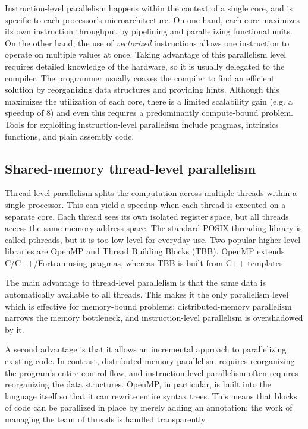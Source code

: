 \documentclass[conference, a4paper]{IEEEtran-modified}
\begin{document}
    Instruction-level parallelism happens within the context of a single core, and is specific to each processor's microarchitecture. On one hand, each core maximizes its own instruction throughput by pipelining and parallelizing functional units. On the other hand, the use of \emph{vectorized} instructions allows one instruction to operate on multiple values at once. Taking advantage of this parallelism level requires detailed knowledge of the hardware, so it is usually delegated to the compiler. The programmer usually coaxes the compiler to find an efficient solution by reorganizing data structures and providing hints. Although this maximizes the utilization of each core, there is a limited scalability gain (e.g. a speedup of 8) and even this requires a predominantly compute-bound problem. Tools for exploiting instruction-level parallelism include  pragmas, intrinsics functions, and plain assembly code.


\subsection{Shared-memory thread-level parallelism}

    Thread-level parallelism splits the computation across multiple threads within a single processor. This can yield a speedup when each thread is executed on a separate core. Each thread sees its own isolated register space, but all threads access the same memory address space. The standard POSIX threading library is called pthreads, but it is too low-level for everyday use. Two popular higher-level libraries are OpenMP and Thread Building Blocks (TBB). OpenMP extends C/C++/Fortran using pragmas, whereas TBB is built from C++ templates.

    The main advantage to thread-level parallelism is that the same data is automatically available to all threads. This makes it the only parallelism level which is effective for memory-bound problems: distributed-memory parallelism narrows the memory bottleneck, and instruction-level parallelism is overshadowed by it. 

    A second advantage is that it allows an incremental approach to parallelizing existing code. In contrast, distributed-memory parallelism requires reorganizing the program's entire control flow, and instruction-level parallelism often requires reorganizing the data structures. OpenMP, in particular, is built into the language itself so that it can rewrite entire syntax trees. This means that blocks of code can be parallized in place by merely adding an annotation; the work of managing the team of threads is handled transparently. 
\end{document}
